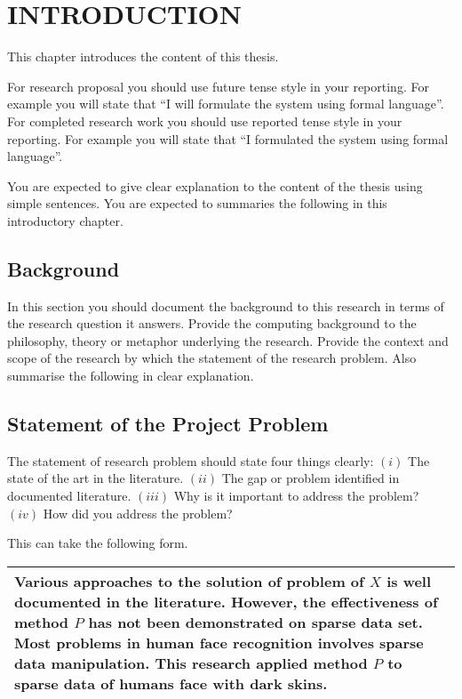 \chapter{\large INTRODUCTION}
\thispagestyle{empty}
\setcounter{page}{1}

This chapter introduces the content of this thesis.

For research proposal you should use future tense style in your reporting. For example you will state that ``I will formulate the system using formal language''.  For completed research work you should use reported tense  style in your reporting. For example you will state that ``I formulated the system using formal language''.  

You are expected to give clear explanation to the content of the thesis using simple sentences. You are expected to summaries the following in this introductory chapter.

\section{Background}
In this section you should document the background to this research in terms of the research question it answers. Provide the computing background to the philosophy, theory or metaphor underlying the research. Provide the context and scope of the research by which the statement of the research problem. Also summarise the following in clear explanation.

\section{Statement of the Project Problem}

The statement of research problem should state four things clearly: $(i)$ The state of the art in the literature.  $(ii)$ The gap or problem identified in documented literature. $(iii)$ Why is it important to address the problem? $(iv)$ How did you address the problem? 

This can take the following form. 

\vspace*{3mm}

\begin{tabular}{||p{14cm}||} \hline
Various approaches to the solution of problem of $X$ is well documented in the literature. However, the effectiveness of method $P$ has not been demonstrated on sparse data set. Most problems in human face recognition involves sparse data manipulation. This research applied method $P$ to sparse data of humans face with dark skins. \\ \hline 
\end{tabular}


